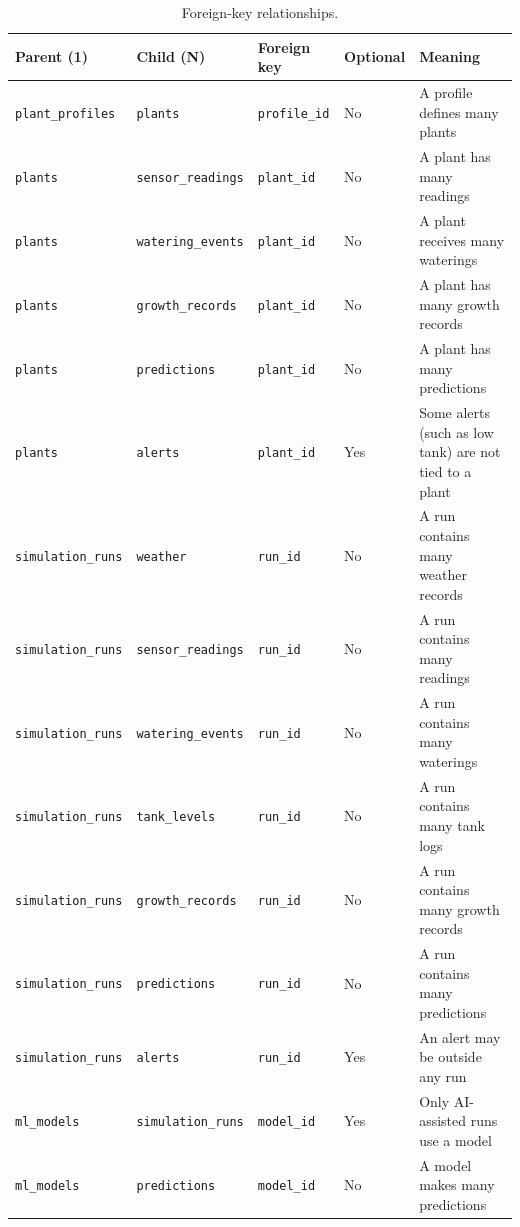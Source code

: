 \documentclass[11pt,a4paper]{article}
\newcommand{\cn}[1]{\texttt{#1}}   %
\begin{document}
\begin{table}[htbp]
\centering
\small
\begin{tabularx}{\textwidth}{@{}l l l l Y@{}}
  \toprule
  \textbf{Parent (1)} & \textbf{Child (N)} & \textbf{Foreign key} & \textbf{Optional} & \textbf{Meaning}\\
  \midrule
  \cn{plant\_profiles} & \cn{plants} & \cn{profile\_id} & No & A profile defines many plants\\
  \cn{plants} & \cn{sensor\_readings} & \cn{plant\_id} & No & A plant has many readings\\
  \cn{plants} & \cn{watering\_events} & \cn{plant\_id} & No & A plant receives many waterings\\
  \cn{plants} & \cn{growth\_records} & \cn{plant\_id} & No & A plant has many growth records\\
  \cn{plants} & \cn{predictions} & \cn{plant\_id} & No & A plant has many predictions\\
  \cn{plants} & \cn{alerts} & \cn{plant\_id} & Yes & Some alerts (such as low tank) are not tied to a plant\\
  \cn{simulation\_runs} & \cn{weather} & \cn{run\_id} & No & A run contains many weather records\\
  \cn{simulation\_runs} & \cn{sensor\_readings} & \cn{run\_id} & No & A run contains many readings\\
  \cn{simulation\_runs} & \cn{watering\_events} & \cn{run\_id} & No & A run contains many waterings\\
  \cn{simulation\_runs} & \cn{tank\_levels} & \cn{run\_id} & No & A run contains many tank logs\\
  \cn{simulation\_runs} & \cn{growth\_records} & \cn{run\_id} & No & A run contains many growth records\\
  \cn{simulation\_runs} & \cn{predictions} & \cn{run\_id} & No & A run contains many predictions\\
  \cn{simulation\_runs} & \cn{alerts} & \cn{run\_id} & Yes & An alert may be outside any run\\
  \cn{ml\_models} & \cn{simulation\_runs} & \cn{model\_id} & Yes & Only AI-assisted runs use a model\\
  \cn{ml\_models} & \cn{predictions} & \cn{model\_id} & No & A model makes many predictions\\
  \bottomrule
\end{tabularx}
\caption{Foreign-key relationships.}
\end{table}
\end{document}
